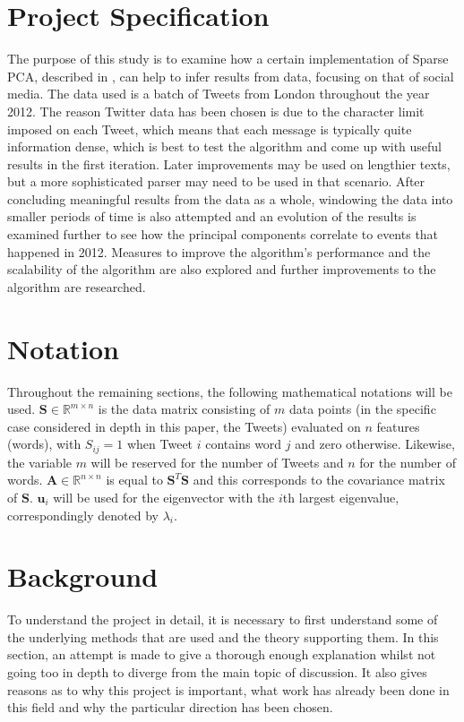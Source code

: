 \documentclass[11pt,a4paper]{article}
\begin{document}

\section{Project Specification}

The purpose of this study is to examine how a certain implementation of Sparse PCA, described in \cite{dimakis}, can help to infer results from data, focusing on that of social media. The data used is a batch of Tweets from London throughout the year 2012. The reason Twitter data has been chosen is due to the character limit imposed on each Tweet, which means that each message is typically quite information dense, which is best to test the algorithm and come up with useful results in the first iteration. Later improvements may be used on lengthier texts, but a more sophisticated parser may need to be used in that scenario. After concluding meaningful results from the data as a whole, windowing the data into smaller periods of time is also attempted and an evolution of the results is examined further to see how the principal components correlate to events that happened in 2012. Measures to improve the algorithm's performance and the scalability of the algorithm are also explored and further improvements to the algorithm are researched.

\section{Notation}

Throughout the remaining sections, the following mathematical notations will be used. $\mathbf{S} \in  \mathbb{R}^{m\times n}$ is the data matrix consisting of $m$ data points (in the specific case considered in depth in this paper, the Tweets) evaluated on $n$ features (words), with $S_{ij} = 1$ when Tweet $i$ contains word $j$ and zero otherwise. Likewise, the variable $m$ will be reserved for the number of Tweets and $n$ for the number of words. $\mathbf{A} \in \mathbb{R}^{n \times n}$ is equal to $\mathbf{S}^T\mathbf{S}$ and this corresponds to the covariance matrix of $\mathbf{S}$. $\mathbf{u}_i$ will be used for the eigenvector with the $i$th largest eigenvalue, correspondingly denoted by $\lambda_i$.
\section{Background}
To understand the project in detail, it is necessary to first understand some of the underlying methods that are used and the theory supporting them. In this section, an attempt is made to give a thorough enough explanation whilst not going too in depth to diverge from the main topic of discussion. It also gives reasons as to why this project is important, what work has already been done in this field and why the particular direction has been chosen. 
\end{document}
